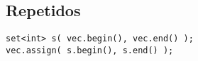 \documentclass{article}
\begin{document}
\subsection*{Repetidos}
\begin{lstlisting}
set<int> s( vec.begin(), vec.end() );
vec.assign( s.begin(), s.end() );
\end{lstlisting}


\pagebreak



\pagebreak

\pagebreak

\pagebreak

\pagebreak
\end{document}
